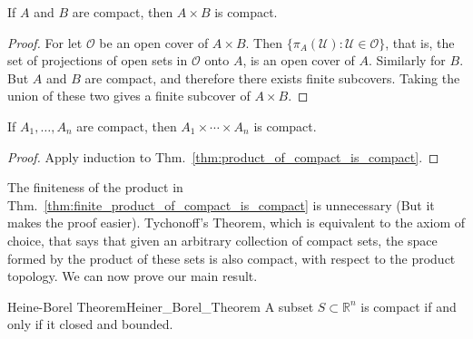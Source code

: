 \documentclass[crop=false,class=book,oneside]{standalone}                      %
\begin{document}
            \begin{theorem}
                \label{thm:product_of_compact_is_compact}%
                If $A$ and $B$ are compact, then $A\times{B}$ is compact.
            \end{theorem}
            \begin{proof}
                For let $\mathcal{O}$ be an open cover of $A\times{B}$. Then
                $\{\pi_{A}(\mathcal{U}):\mathcal{U}\in\mathcal{O}\}$, that is,
                the set of projections of open sets in $\mathcal{O}$ onto $A$,
                is an open cover of $A$. Similarly for $B$. But $A$ and $B$ are
                compact, and therefore there exists finite subcovers. Taking
                the union of these two gives a finite subcover of $A\times{B}$.
            \end{proof}
            \begin{theorem}
                \label{thm:finite_product_of_compact_is_compact}%
                If $A_{1},\hdots,A_{n}$ are compact, then
                $A_{1}\times\cdots\times{A_{n}}$ is compact.
            \end{theorem}
            \begin{proof}
                Apply induction to
                Thm.~\ref{thm:product_of_compact_is_compact}.
            \end{proof}
            The finiteness of the product in
            Thm.~\ref{thm:finite_product_of_compact_is_compact} is unnecessary
            (But it makes the proof easier). Tychonoff's Theorem, which is
            equivalent to the axiom of choice, that says that given an
            arbitrary collection of compact sets, the space formed by the
            product of these sets is also compact, with respect to the product
            topology. We can now prove our main result.
            \begin{ftheorem}{Heine-Borel Theorem}{Heiner_Borel_Theorem}
                A subset $S\subset\mathbb{R}^{n}$ is compact if
                and only if it closed and bounded.
            \end{ftheorem}
\end{document}
